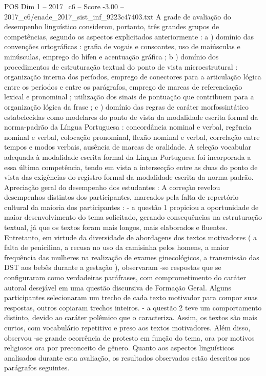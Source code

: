 \begin{textsample}{POS Dim 1 – 2017\_c6 – Score -3.00 – 2017\_c6/enade\_2017\_sist\_inf\_9223c47403.txt}
A grade de avaliação do desempenho linguístico considerou, portanto, três grandes grupos de competências, segundo os aspectos explicitados anteriormente : a ) domínio das convenções ortográficas : grafia de vogais e consoantes, uso de maiúsculas e minúsculas, emprego do hífen e acentuação gráfica ; b ) domínio dos procedimentos de estruturação textual do ponto de vista microestrutural : organização interna dos períodos, emprego de conectores para a articulação lógica entre os períodos e entre os parágrafos, emprego de marcas de referenciação lexical e pronominal ; utilização dos sinais de pontuação que contribuem para a organização lógica da frase ; c ) domínio das regras de caráter morfossintático estabelecidas como modelares do ponto de vista da modalidade escrita formal da norma-padrão da Língua Portuguesa : concordância nominal e verbal, regência nominal e verbal, colocação pronominal, flexão nominal e verbal, correlação entre tempos e modos verbais, ausência de marcas de oralidade.
A seleção vocabular adequada à modalidade escrita formal da Língua Portuguesa foi incorporada a essa última competência, tendo em vista a intersecção entre as duas do ponto de vista das exigências do registro formal da modalidade escrita da norma-padrão.
Apreciação geral do desempenho dos estudantes : A correção revelou desempenhos distintos dos participantes, marcados pela falta de repertório cultural da maioria dos participantes : - a questão 1 propiciou a oportunidade de maior desenvolvimento do tema solicitado, gerando consequências na estruturação textual, já que os textos foram mais longos, mais elaborados e fluentes.
Entretanto, em virtude da diversidade de abordagens dos textos motivadores ( a falta de penicilina, a recusa no uso da camisinha pelos homens, a maior frequência das mulheres na realização de exames ginecológicos, a transmissão das DST aos bebês durante a gestação ), observaram -se respostas que se configuraram como verdadeiras paráfrases, com comprometimento do caráter autoral desejável em uma questão discursiva de Formação Geral.
Alguns participantes selecionaram um trecho de cada texto motivador para compor suas respostas, outros copiaram trechos inteiros. - a questão 2 teve um comportamento distinto, devido ao caráter polêmico que o caracteriza.
Assim, os textos são mais curtos, com vocabulário repetitivo e preso aos textos motivadores.
Além disso, observou -se grande ocorrência de protesto em função do tema, ora por motivos religiosos ora por preconceito de gênero.
Quanto aos aspectos linguísticos analisados durante esta avaliação, os resultados observados estão descritos nos parágrafos seguintes.

\end{textsample}
